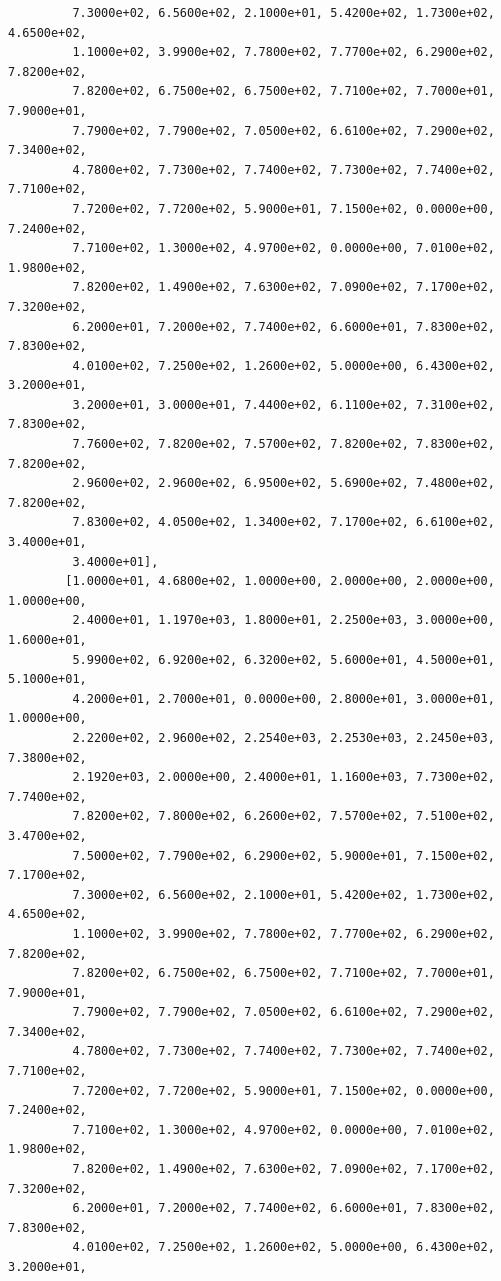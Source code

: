 \documentclass[
  letterpaper,
  DIV=11,
  numbers=noendperiod]{scrreprt}
\begin{document}
\begin{tcolorbox}
\begin{verbatim}
         7.3000e+02, 6.5600e+02, 2.1000e+01, 5.4200e+02, 1.7300e+02, 4.6500e+02,
         1.1000e+02, 3.9900e+02, 7.7800e+02, 7.7700e+02, 6.2900e+02, 7.8200e+02,
         7.8200e+02, 6.7500e+02, 6.7500e+02, 7.7100e+02, 7.7000e+01, 7.9000e+01,
         7.7900e+02, 7.7900e+02, 7.0500e+02, 6.6100e+02, 7.2900e+02, 7.3400e+02,
         4.7800e+02, 7.7300e+02, 7.7400e+02, 7.7300e+02, 7.7400e+02, 7.7100e+02,
         7.7200e+02, 7.7200e+02, 5.9000e+01, 7.1500e+02, 0.0000e+00, 7.2400e+02,
         7.7100e+02, 1.3000e+02, 4.9700e+02, 0.0000e+00, 7.0100e+02, 1.9800e+02,
         7.8200e+02, 1.4900e+02, 7.6300e+02, 7.0900e+02, 7.1700e+02, 7.3200e+02,
         6.2000e+01, 7.2000e+02, 7.7400e+02, 6.6000e+01, 7.8300e+02, 7.8300e+02,
         4.0100e+02, 7.2500e+02, 1.2600e+02, 5.0000e+00, 6.4300e+02, 3.2000e+01,
         3.2000e+01, 3.0000e+01, 7.4400e+02, 6.1100e+02, 7.3100e+02, 7.8300e+02,
         7.7600e+02, 7.8200e+02, 7.5700e+02, 7.8200e+02, 7.8300e+02, 7.8200e+02,
         2.9600e+02, 2.9600e+02, 6.9500e+02, 5.6900e+02, 7.4800e+02, 7.8200e+02,
         7.8300e+02, 4.0500e+02, 1.3400e+02, 7.1700e+02, 6.6100e+02, 3.4000e+01,
         3.4000e+01],
        [1.0000e+01, 4.6800e+02, 1.0000e+00, 2.0000e+00, 2.0000e+00, 1.0000e+00,
         2.4000e+01, 1.1970e+03, 1.8000e+01, 2.2500e+03, 3.0000e+00, 1.6000e+01,
         5.9900e+02, 6.9200e+02, 6.3200e+02, 5.6000e+01, 4.5000e+01, 5.1000e+01,
         4.2000e+01, 2.7000e+01, 0.0000e+00, 2.8000e+01, 3.0000e+01, 1.0000e+00,
         2.2200e+02, 2.9600e+02, 2.2540e+03, 2.2530e+03, 2.2450e+03, 7.3800e+02,
         2.1920e+03, 2.0000e+00, 2.4000e+01, 1.1600e+03, 7.7300e+02, 7.7400e+02,
         7.8200e+02, 7.8000e+02, 6.2600e+02, 7.5700e+02, 7.5100e+02, 3.4700e+02,
         7.5000e+02, 7.7900e+02, 6.2900e+02, 5.9000e+01, 7.1500e+02, 7.1700e+02,
         7.3000e+02, 6.5600e+02, 2.1000e+01, 5.4200e+02, 1.7300e+02, 4.6500e+02,
         1.1000e+02, 3.9900e+02, 7.7800e+02, 7.7700e+02, 6.2900e+02, 7.8200e+02,
         7.8200e+02, 6.7500e+02, 6.7500e+02, 7.7100e+02, 7.7000e+01, 7.9000e+01,
         7.7900e+02, 7.7900e+02, 7.0500e+02, 6.6100e+02, 7.2900e+02, 7.3400e+02,
         4.7800e+02, 7.7300e+02, 7.7400e+02, 7.7300e+02, 7.7400e+02, 7.7100e+02,
         7.7200e+02, 7.7200e+02, 5.9000e+01, 7.1500e+02, 0.0000e+00, 7.2400e+02,
         7.7100e+02, 1.3000e+02, 4.9700e+02, 0.0000e+00, 7.0100e+02, 1.9800e+02,
         7.8200e+02, 1.4900e+02, 7.6300e+02, 7.0900e+02, 7.1700e+02, 7.3200e+02,
         6.2000e+01, 7.2000e+02, 7.7400e+02, 6.6000e+01, 7.8300e+02, 7.8300e+02,
         4.0100e+02, 7.2500e+02, 1.2600e+02, 5.0000e+00, 6.4300e+02, 3.2000e+01,

\end{verbatim}
\end{tcolorbox}
\end{document}
